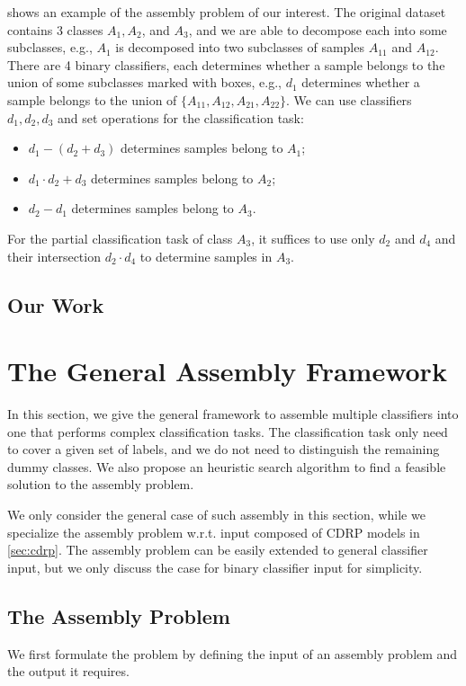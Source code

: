 \documentclass[sigplan,10pt,review]{acmart}\settopmatter{printfolios=true,printccs=false,printacmref=false}
\begin{document}
 shows an example of the assembly problem of our interest.
The original dataset contains 3 classes $A_1, A_2$, and $A_3$, and we are able to decompose each into some subclasses, e.g., $A_1$ is decomposed into two subclasses of samples $A_{11}$ and $A_{12}$.
There are 4 binary classifiers, each determines whether a sample belongs to the union of some subclasses marked with boxes, e.g., $d_1$ determines whether a sample belongs to the union of $\{A_{11}, A_{12}, A_{21}, A_{22}\}$.
We can use classifiers $d_1, d_2, d_3$ and set operations for the classification task:
\begin{itemize}
	\item $d_1 - (d_2 + d_3)$ determines samples belong to $A_1$;
	\item $d_1 \cdot d_2 + d_3$ determines samples belong to $A_2$;
	\item $d_2 - d_1$ determines samples belong to $A_3$.
\end{itemize}
For the partial classification task of class $A_3$, it suffices to use only $d_2$ and $d_4$ and their intersection $d_2 \cdot d_4$ to determine samples in $A_3$.

\subsection{Our Work}

\section{The General Assembly Framework}
\label{sec:assembly}
In this section, we give the general framework to assemble multiple classifiers into one that performs complex classification tasks.
The classification task only need to cover a given set of labels, and we do not need to distinguish the remaining dummy classes.
We also propose an heuristic search algorithm to find a feasible solution to the assembly problem.

We only consider the general case of such assembly in this section, while we specialize the assembly problem w.r.t. input composed of CDRP models in \cref{sec:cdrp}.
The assembly problem can be easily extended to general classifier input, but we only discuss the case for binary classifier input for simplicity.

\subsection{The Assembly Problem}
\label{sec:assemble-problem}
We first formulate the problem by defining the input of an assembly problem and the output it requires.
\end{document}
